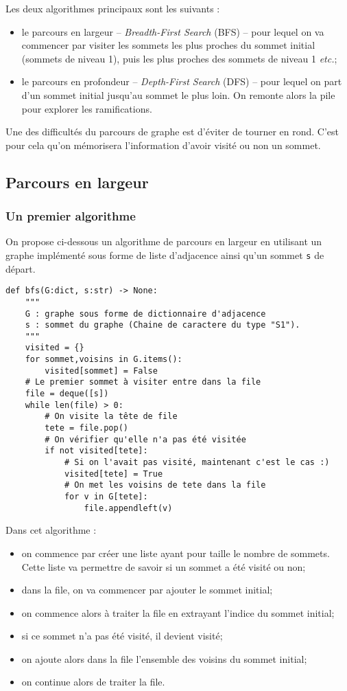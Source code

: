 Les deux algorithmes principaux sont les suivants :
\begin{itemize}
\item le parcours en largeur -- \textit{Breadth-First Search} (BFS) -- pour lequel on va commencer par visiter les sommets les plus proches du sommet initial (sommets de niveau 1), puis les plus proches des sommets de niveau 1 \textit{etc.};
\item le parcours en profondeur  -- \textit{Depth-First Search} (DFS) -- pour lequel on part d'un sommet initial jusqu'au sommet le plus loin. On remonte alors la pile pour explorer les ramifications.
\end{itemize}

Une des difficultés du parcours de graphe est d'éviter de tourner en rond. C'est pour cela qu'on mémorisera l'information d'avoir visité ou non un sommet. 

\subsection{Parcours en largeur}

\subsubsection{Un premier algorithme}
On propose ci-dessous un algorithme de parcours en largeur en utilisant un graphe implémenté sous forme de liste d'adjacence ainsi qu'un sommet \texttt{s} de départ. 

\begin{lstlisting}
def bfs(G:dict, s:str) -> None:
    """
    G : graphe sous forme de dictionnaire d'adjacence
    s : sommet du graphe (Chaine de caractere du type "S1").
    """
    visited = {}
    for sommet,voisins in G.items():
        visited[sommet] = False
    # Le premier sommet à visiter entre dans la file
    file = deque([s])
    while len(file) > 0:
        # On visite la tête de file
        tete = file.pop()
        # On vérifier qu'elle n'a pas été visitée
        if not visited[tete]:
            # Si on l'avait pas visité, maintenant c'est le cas :)
            visited[tete] = True            
            # On met les voisins de tete dans la file
            for v in G[tete]:
                file.appendleft(v)
\end{lstlisting}

Dans cet algorithme : 
\begin{itemize}
\item on commence par créer une liste ayant pour taille le nombre de sommets. Cette liste va permettre de savoir si un sommet a été visité ou non;
\item dans la file, on va commencer par ajouter le sommet initial;
\item on commence alors à traiter la file en extrayant l'indice du sommet initial;
\item si ce sommet n'a pas été visité, il devient visité;
\item on ajoute alors dans la file l'ensemble des voisins du sommet initial;
\item on continue alors de traiter la file. 
\end{itemize}

